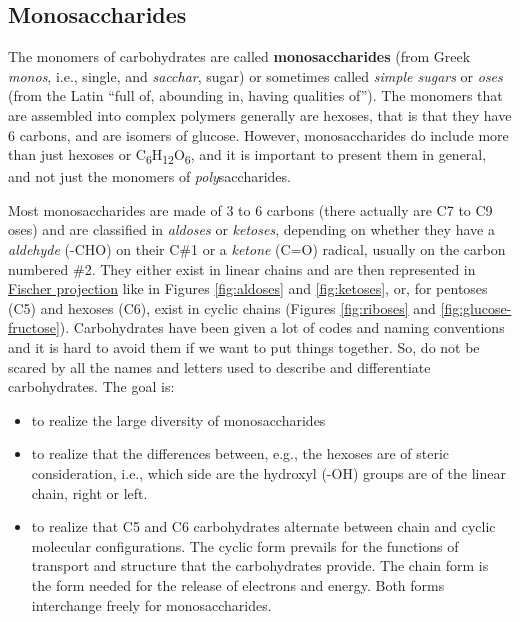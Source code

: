 \documentclass[]{book}
\providecommand{\tightlist}{%
  \setlength{\itemsep}{0pt}\setlength{\parskip}{0pt}}
\theoremstyle{definition}
\theoremstyle{definition}
\theoremstyle{definition}
\theoremstyle{remark}
\begin{document}
\subsection{Monosaccharides}\label{monosaccharides}

The monomers of carbohydrates are called \textbf{monosaccharides} (from
Greek \emph{monos}, i.e., single, and \emph{sacchar}, sugar) or
sometimes called \emph{simple sugars} or \emph{oses} (from the Latin
``full of, abounding in, having qualities of''). The monomers that are
assembled into complex polymers generally are hexoses, that is that they
have 6 carbons, and are isomers of glucose. However, monosaccharides do
include more than just hexoses or
C\textsubscript{6}H\textsubscript{12}O\textsubscript{6}, and it is
important to present them in general, and not just the monomers of
\emph{poly}saccharides.

Most monosaccharides are made of 3 to 6 carbons (there actually are C7
to C9 oses) and are classified in \emph{aldoses} or \emph{ketoses},
depending on whether they have a \emph{aldehyde} (-CHO) on their C\#1 or
a \emph{ketone} (C=O) radical, usually on the carbon numbered \#2. They
either exist in linear chains and are then represented in
\protect\hyperlink{structural-formula}{Fischer projection} like in
Figures \ref{fig:aldoses} and \ref{fig:ketoses}, or, for pentoses (C5)
and hexoses (C6), exist in cyclic chains (Figures \ref{fig:riboses} and
\ref{fig:glucose-fructose}). Carbohydrates have been given a lot of
codes and naming conventions and it is hard to avoid them if we want to
put things together. So, do not be scared by all the names and letters
used to describe and differentiate carbohydrates. The goal is:

\begin{itemize}
\tightlist
\item
  to realize the large diversity of monosaccharides
\item
  to realize that the differences between, e.g., the hexoses are of
  steric consideration, i.e., which side are the hydroxyl (-OH) groups
  are of the linear chain, right or left.
\item
  to realize that C5 and C6 carbohydrates alternate between chain and
  cyclic molecular configurations. The cyclic form prevails for the
  functions of transport and structure that the carbohydrates provide.
  The chain form is the form needed for the release of electrons and
  energy. Both forms interchange freely for monosaccharides.
\end{itemize}
\end{document}
